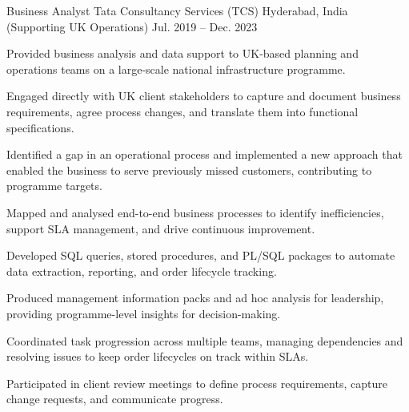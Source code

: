 \begin{cventries}
  \cventry
    {Business Analyst} %
    {Tata Consultancy Services (TCS)} %
    {Hyderabad, India (Supporting UK Operations)} %
    {Jul. 2019 -- Dec. 2023} %
    {
      \begin{cvitems}
        \item {Provided business analysis and data support to UK-based planning and operations teams on a large-scale national infrastructure programme.}
        \item {Engaged directly with UK client stakeholders to capture and document business requirements, agree process changes, and translate them into functional specifications.}
        \item {Identified a gap in an operational process and implemented a new approach that enabled the business to serve previously missed customers, contributing to programme targets.}
        \item {Mapped and analysed end-to-end business processes to identify inefficiencies, support SLA management, and drive continuous improvement.}
        \item {Developed SQL queries, stored procedures, and PL/SQL packages to automate data extraction, reporting, and order lifecycle tracking.}
        \item {Produced management information packs and ad hoc analysis for leadership, providing programme-level insights for decision-making.}
        \item {Coordinated task progression across multiple teams, managing dependencies and resolving issues to keep order lifecycles on track within SLAs.}
        \item {Participated in client review meetings to define process requirements, capture change requests, and communicate progress.}
      \end{cvitems}
    }

\end{cventries}

